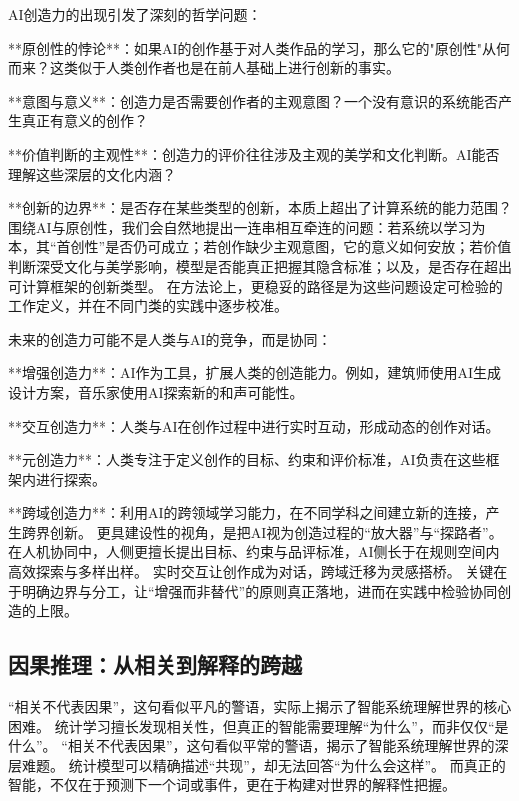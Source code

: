 AI创造力的出现引发了深刻的哲学问题：

**原创性的悖论**：如果AI的创作基于对人类作品的学习，那么它的"原创性"从何而来？这类似于人类创作者也是在前人基础上进行创新的事实。

**意图与意义**：创造力是否需要创作者的主观意图？一个没有意识的系统能否产生真正有意义的创作？

**价值判断的主观性**：创造力的评价往往涉及主观的美学和文化判断。AI能否理解这些深层的文化内涵？

**创新的边界**：是否存在某些类型的创新，本质上超出了计算系统的能力范围？
围绕AI与原创性，我们会自然地提出一连串相互牵连的问题：若系统以学习为本，其“首创性”是否仍可成立；若创作缺少主观意图，它的意义如何安放；若价值判断深受文化与美学影响，模型是否能真正把握其隐含标准；以及，是否存在超出可计算框架的创新类型。
在方法论上，更稳妥的路径是为这些问题设定可检验的工作定义，并在不同门类的实践中逐步校准。

未来的创造力可能不是人类与AI的竞争，而是协同：

**增强创造力**：AI作为工具，扩展人类的创造能力。例如，建筑师使用AI生成设计方案，音乐家使用AI探索新的和声可能性。

**交互创造力**：人类与AI在创作过程中进行实时互动，形成动态的创作对话。

**元创造力**：人类专注于定义创作的目标、约束和评价标准，AI负责在这些框架内进行探索。

**跨域创造力**：利用AI的跨领域学习能力，在不同学科之间建立新的连接，产生跨界创新。
更具建设性的视角，是把AI视为创造过程的“放大器”与“探路者”。
在人机协同中，人侧更擅长提出目标、约束与品评标准，AI侧长于在规则空间内高效探索与多样出样。
实时交互让创作成为对话，跨域迁移为灵感搭桥。
关键在于明确边界与分工，让“增强而非替代”的原则真正落地，进而在实践中检验协同创造的上限。


\subsection{因果推理：从相关到解释的跨越}

“相关不代表因果”，这句看似平凡的警语，实际上揭示了智能系统理解世界的核心困难。
统计学习擅长发现相关性，但真正的智能需要理解“为什么”，而非仅仅“是什么”。
“相关不代表因果”，这句看似平常的警语，揭示了智能系统理解世界的深层难题。
统计模型可以精确描述“共现”，却无法回答“为什么会这样”。
而真正的智能，不仅在于预测下一个词或事件，更在于构建对世界的解释性把握。

